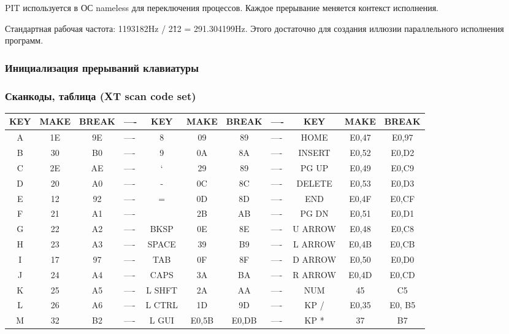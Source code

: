 \documentclass[12pt]{article}
\begin{document}
	PIT используется в ОС nameless для переключения процессов. Каждое прерывание меняется контекст исполнения.

	Стандартная рабочая частота: 1193182Hz / 2\^12 = 291.304199Hz. Этого достаточно для создания иллюзии параллельного исполнения программ.
\subsubsection{Инициализация прерываний клавиатуры}
\newpage
\subsubsection{Сканкоды, таблица (XT scan code set)}
\hspace*{-2.8cm}
\begin{tabular}{|c|c|c|l|c|c|c|l|c|c|c|}
\hline  
	KEY & MAKE & BREAK &----& KEY  &  MAKE  & BREAK &----&    KEY  & MAKE  & BREAK \\ \hline
	 A  &  1E  &  9E   &----&  8   &   09   &   89  &----&   HOME  & E0,47 & E0,97 \\ \hline
	 B  &  30  &  B0   &----&  9   &   0A   &   8A  &----&  INSERT & E0,52 & E0,D2 \\ \hline
	 C  &  2E  &  AE   &----&  `   &   29   &   89  &----&  PG UP  & E0,49 & E0,C9 \\ \hline
	 D  &  20  &  A0   &----&  -   &   0C   &   8C  &----&  DELETE & E0,53 & E0,D3 \\ \hline
	 E  &  12  &  92   &----&  =   &   0D   &   8D  &----&  END    & E0,4F & E0,CF \\ \hline
	 F  &  21  &  A1   &----&  \   &   2B   &   AB  &----&  PG DN  & E0,51 & E0,D1 \\ \hline
	 G  &  22  &  A2   &----& BKSP &   0E   &   8E  &----& U ARROW & E0,48 & E0,C8 \\ \hline
	 H  &  23  &  A3   &----&SPACE &   39   &   B9  &----& L ARROW & E0,4B & E0,CB \\ \hline
	 I  &  17  &  97   &----&  TAB &   0F   &   8F  &----& D ARROW & E0,50 & E0,D0 \\ \hline
	 J  &  24  &  A4   &----& CAPS &   3A   &   BA  &----& R ARROW & E0,4D & E0,CD \\ \hline
	 K  &  25  &  A5   &----&L SHFT&   2A   &   AA  &----&   NUM   &   45  & C5    \\ \hline
	 L  &  26  &  A6   &----&L CTRL&   1D   &   9D  &----&   KP /  & E0,35 & E0, B5 \\ \hline
	 M  &  32  &  B2   &----&L GUI &  E0,5B & E0,DB &----&   KP *  &   37  & B7    \\ \hline

\end{tabular}
\end{document}
